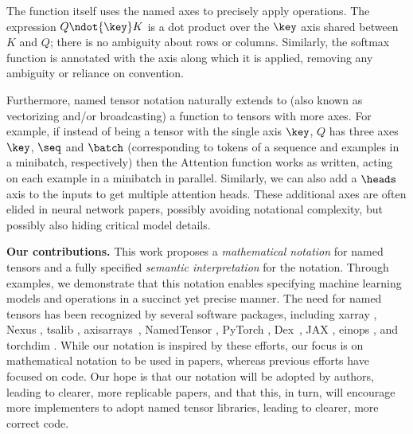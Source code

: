The function itself uses the named axes to precisely apply operations.  The expression $Q \ndot{\key} K$ is a dot product over the $\key$ axis shared between $K$ and $Q$; there is no ambiguity about rows or columns. Similarly, the softmax function is annotated with the axis along which it is applied, removing any ambiguity or reliance on convention. 

Furthermore, named tensor notation naturally extends to \textit{\liftingVBG} (also known as vectorizing and/or broadcasting) a function to tensors with more axes. For example, if instead of being a tensor with the single axis $\key$, $Q$  has three axes $\key$, $\seq$ and $\batch$  (corresponding to tokens of a sequence and examples in a minibatch, respectively) then the $\text{Attention}$ function works as written, acting on each example in a minibatch in parallel.
Similarly, we can also add a $\heads$ axis to the inputs to get multiple attention heads.
These additional axes are often elided in neural network papers, possibly avoiding notational complexity, but possibly also hiding critical model details. 

\textbf{Our contributions.}  This work proposes a \emph{mathematical notation} for named tensors and a fully specified \emph{semantic interpretation} for the notation.
Through examples, we demonstrate that this notation enables specifying machine learning models and operations in a succinct yet precise manner.
The need for named tensors has been recognized by several software packages, including xarray \citep{xarray}, Nexus \citep{chen2017typesafe}, tsalib \citep{tsalib}, axisarrays~\citep{axisarrays}, NamedTensor \citep{namedtensor}, PyTorch \citep{named-tensors}, Dex~\citep{dex}, JAX \citep{jax_xmap}, einops \citep{einops}, and torchdim \citep{torchdim}. While our notation is inspired by these efforts, our focus is on mathematical notation to be used in papers, whereas previous efforts have focused on code. Our hope is that our notation will be adopted by authors, leading to clearer, more replicable papers, and that this, in turn, will encourage more implementers to adopt named tensor libraries, leading to clearer, more correct code.

